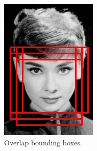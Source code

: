 \begin{figure}[!h]
	\centering
	\begin{subfigure}{.13\linewidth}
		\includegraphics[width=1\linewidth]{images/detection/img1_noNMS}
		\caption{Overlap bounding boxes.}
		\label{fig:sub_noNMS}
	\end{subfigure}
	\begin{subfigure}{.13\linewidth}

\end{subfigure}
\end{figure}
